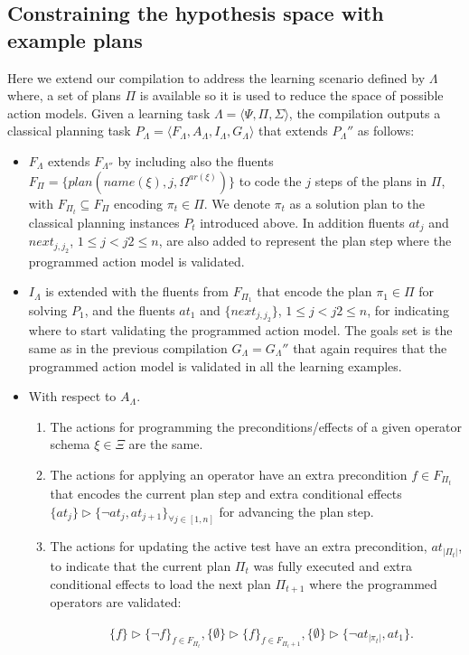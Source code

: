 \documentclass[letterpaper]{article} %
\newcommand{\tup}[1]{{\langle #1 \rangle}}
\begin{document}
\subsection{Constraining the hypothesis space with example plans}
Here  we extend our compilation to address the learning scenario defined by $\Lambda$ where, a set of plans $\Pi$ is available so it is used to reduce the space of possible action models. Given a learning task $\Lambda=\tup{\Psi,\Pi,\Sigma}$, the compilation outputs a classical planning task $P_{\Lambda}=\tup{F_{\Lambda},A_{\Lambda},I_{\Lambda},G_{\Lambda}}$ that extends $P_{\Lambda}''$ as follows: 
\begin{itemize}
\item $F_{\Lambda}$ extends $F_{\Lambda''}$ by including also the fluents $F_{\Pi}=\{plan(name(\xi),j,\Omega^{ar(\xi)})\}$ to code the $j$ steps of the plans in $\Pi$, with $F_{\Pi_t}\subseteq F_{\Pi}$ encoding $\pi_t\in \Pi$. We denote $\pi_t$ as a solution plan to the classical planning instances $P_t$ introduced above. In addition fluents $at_j$ and $next_{j,j_2}$, {\small $1\leq j<j2\leq n$}, are also added to represent the plan step where the programmed action model is validated.
\item $I_{\Lambda}$ is extended with the fluents from $F_{\Pi_1}$ that encode the plan $\pi_1\in \Pi$ for solving $P_1$, and the fluents $at_1$ and $\{next_{j,j_2}\}$, {\small $1\leq j<j2\leq n$}, for indicating where to start validating the programmed action model. The goals set is the same as in the previous compilation $G_{\Lambda}=G_{\Lambda}''$ that again requires that the programmed action model is validated in all  the learning examples.
\item With respect to $A_{\Lambda}$.
\begin{enumerate}
\item The actions for programming the preconditions/effects of a given operator schema $\xi\in\Xi$ are the same.
\item The actions for applying an operator have an extra precondition $f\in F_{\Pi_t}$ that encodes the current plan step and extra conditional effects $\{at_{j}\}\rhd\{\neg at_{j},at_{j+1}\}_{\forall j\in [1,n]}$ for advancing the plan step.
\item The actions for updating the active test have an extra precondition, $at_{|\Pi_t|}$, to indicate that the current plan $\Pi_t$ was fully executed and extra conditional effects to load the next plan $\Pi_{t+1}$ where the programmed operators are validated:
\begin{small}
\begin{align*}
&\{f\}\rhd\{\neg f\}_{f\in F_{\Pi_t}}, \{\emptyset\}\rhd\{f\}_{f\in F_{\Pi_t+1}},\{\emptyset\}\rhd\{\neg at_{|\pi_t|},at_1\}.
\end{align*}
\end{small}
\end{enumerate}
\end{itemize}
\end{document}
